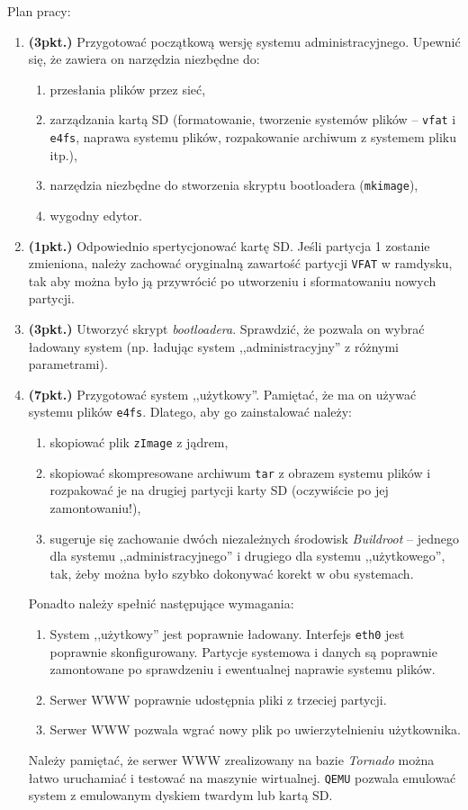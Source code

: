\documentclass{article}
\begin{document}
Plan pracy:
\begin{enumerate}
	\item \textbf{(3pkt.)} Przygotować początkową wersję systemu administracyjnego. Upewnić się, że zawiera on narzędzia niezbędne do:
	\begin{enumerate}
		\item przesłania plików przez sieć,
		\item zarządzania kartą SD (formatowanie, tworzenie systemów plików -- \texttt{vfat} i \texttt{e4fs}, naprawa systemu plików, rozpakowanie archiwum z systemem pliku itp.),
		\item narzędzia niezbędne do stworzenia skryptu bootloadera (\texttt{mkimage}),
		\item wygodny edytor.
	\end{enumerate}
	\item \textbf{(1pkt.)} Odpowiednio spertycjonować kartę SD. Jeśli partycja 1 zostanie zmieniona, należy zachować oryginalną zawartość partycji \texttt{VFAT} w ramdysku, tak aby można było ją przywrócić po utworzeniu i sformatowaniu nowych partycji.
	\item \textbf{(3pkt.)} Utworzyć skrypt \emph{bootloadera}. Sprawdzić, że pozwala on wybrać ładowany system (np. ładując system ,,administracyjny'' z różnymi parametrami).
	\item \textbf{(7pkt.)} Przygotować system ,,użytkowy''. Pamiętać, że ma on używać systemu plików \texttt{e4fs}. Dlatego, aby go zainstalować należy:
		\begin{enumerate}
			\item skopiować plik \texttt{zImage} z jądrem,
			\item skopiować skompresowane archiwum \texttt{tar} z obrazem systemu plików i rozpakować je na drugiej partycji karty SD (oczywiście po jej zamontowaniu!),
			\item sugeruje się zachowanie dwóch niezależnych środowisk \emph{Buildroot} -- jednego dla systemu ,,administracyjnego'' i drugiego dla systemu ,,użytkowego'', tak, żeby można było szybko dokonywać korekt w obu systemach.
		\end{enumerate}
		Ponadto należy spełnić następujące wymagania:
		\begin{enumerate}
			\item System ,,użytkowy'' jest poprawnie ładowany. Interfejs \texttt{eth0} jest poprawnie skonfigurowany. Partycje systemowa i danych są poprawnie zamontowane po sprawdzeniu i ewentualnej naprawie systemu plików.
			\item Serwer WWW poprawnie udostępnia pliki z trzeciej partycji.
			\item Serwer WWW pozwala wgrać nowy plik po uwierzytelnieniu użytkownika.
		\end{enumerate}
		Należy pamiętać, że serwer WWW zrealizowany na bazie \emph{Tornado} można łatwo uruchamiać i testować na maszynie wirtualnej. \texttt{QEMU} pozwala emulować system z emulowanym dyskiem twardym lub kartą SD.
\end{enumerate}
\end{document}
